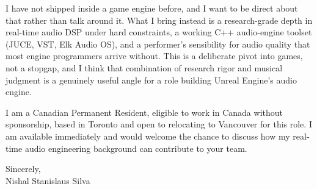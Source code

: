 \documentclass[11pt]{article}
\begin{document}
\vspace{0.5em}
\noindent I have not shipped inside a game engine before, and I want to be direct about that rather than talk around it. What I bring instead is a research-grade depth in real-time audio DSP under hard constraints, a working C++ audio-engine toolset (JUCE, VST, Elk Audio OS), and a performer's sensibility for audio quality that most engine programmers arrive without. This is a deliberate pivot into games, not a stopgap, and I think that combination of research rigor and musical judgment is a genuinely useful angle for a role building Unreal Engine's audio engine.

\vspace{0.5em}
\noindent I am a Canadian Permanent Resident, eligible to work in Canada without sponsorship, based in Toronto and open to relocating to Vancouver for this role. I am available immediately and would welcome the chance to discuss how my real-time audio engineering background can contribute to your team.

\vspace{1em}
\noindent Sincerely, \\
Nishal Stanislaus Silva
\end{document}
